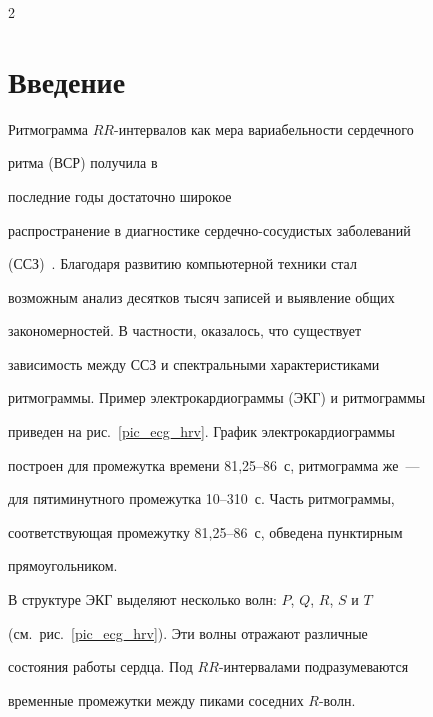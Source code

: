       \begin{multicols}{2}





      \label{st\stat}





\section{Введение}





Ритмограмма $RR$-интервалов как мера вариабельности сердечного


ритма (ВСР) получила в\linebreak


 последние годы достаточно широкое


распространение в диагностике сердечно-сосудистых заболеваний


(ССЗ)~\cite{1ma, 2ma}. Благодаря развитию компью\-терной техники стал


возможным анализ десятков тысяч записей и выявление общих


закономер\-ностей. В частности, оказалось, что существует\linebreak


зависимость между ССЗ и спектральными характеристиками


ритмограммы. Пример электрокардиограммы (ЭКГ) и ритмограммы


приведен на рис.~\ref{pic_ecg_hrv}. График электрокардиограммы


построен для промежутка времени 81,25--86~с, ритмограмма же~---


для пятиминутного промежутка 10--310~с. Часть ритмограммы,


соответствующая промежутку 81,25--86~с, обведена пунктирным


прямоугольником.








В структуре ЭКГ выделяют несколько волн: $P$, $Q$, $R$, $S$ и $T$


(см.\ рис.~\ref{pic_ecg_hrv}). Эти волны отражают различные


состояния работы сердца. Под $RR$-ин\-тер\-ва\-ла\-ми подразумеваются


временные промежутки между пиками соседних $R$-волн.






\end{multicols}
